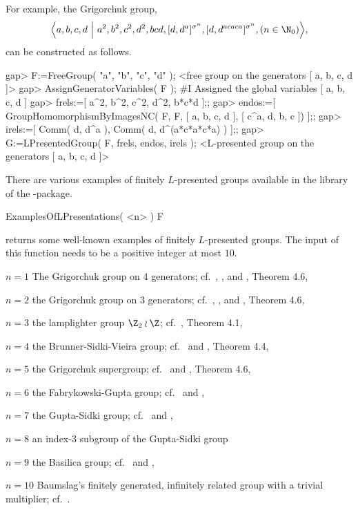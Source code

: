 For example, the Grigorchuk group, 
$$ \Big\langle a,b,c,d~\Big|~a^2,b^2,c^2,d^2,bcd,[d,d^a]^{\sigma^n},
   [d,d^{acaca}]^{\sigma^n},(n\in\N_0) \Big\rangle,$$
can be constructed as follows. 

\beginexample
gap> F:=FreeGroup( "a", "b", "c", "d" );
<free group on the generators [ a, b, c, d ]>
gap> AssignGeneratorVariables( F );
#I  Assigned the global variables [ a, b, c, d ]
gap> frels:=[ a^2, b^2, c^2, d^2, b*c*d ];;
gap> endos:=[ GroupHomomorphismByImagesNC( F, F, [ a, b, c, d ], [ c^a, d, b, c ]) ];;
gap> irels:=[ Comm( d, d^a ), Comm( d, d^(a*c*a*c*a) ) ];;
gap> G:=LPresentedGroup( F, frels, endos, irels );
<L-presented group on the generators [ a, b, c, d ]>
\endexample

There are various examples of finitely $L$-presented groups available
in the library of the \NQL-package.

\> ExamplesOfLPresentations( <n> ) F

returns some well-known examples of finitely $L$-presented groups. The
input of this function needs to be a positive integer at most $10$.

\beginitems
$n=1$ The Grigorchuk group on 4 generators; cf.~\cite{Grigorchuk80}, 
      \cite{Lysenok85}, and \cite{Bartholdi03}, Theorem 4.6,

$n=2$ the Grigorchuk group on 3 generators; cf.~\cite{Grigorchuk80},
      \cite{Lysenok85}, and \cite{Bartholdi03}, Theorem 4.6,

$n=3$ the lamplighter group $\Z_2\wr\Z$; cf.~\cite{Bartholdi03}, Theorem 4.1,

$n=4$ the Brunner-Sidki-Vieira group; cf.~\cite{BrunnerVieiraSidki99} and
      \cite{Bartholdi03}, Theorem 4.4,

$n=5$ the Grigorchuk supergroup; cf.~\cite{BartholdiGrigorchuk02} and
      \cite{Bartholdi03}, Theorem 4.6,

$n=6$ the Fabrykowski-Gupta group; cf.~\cite{FabrykowskiGupta85} and 
      \cite{BEH08},

$n=7$ the Gupta-Sidki group; cf.~\cite{Sidki87} and 
      \cite{BEH08},

$n=8$ an index-$3$ subgroup of the Gupta-Sidki group

$n=9$ the Basilica group; cf.~\cite{GrigorchukZuk02} and
      \cite{BartholdiVirag05},
 
$n=10$ Baumslag's finitely generated, infinitely related group 
       with a trivial multiplier; cf.~\cite{Baumslag71}.

\enditems

